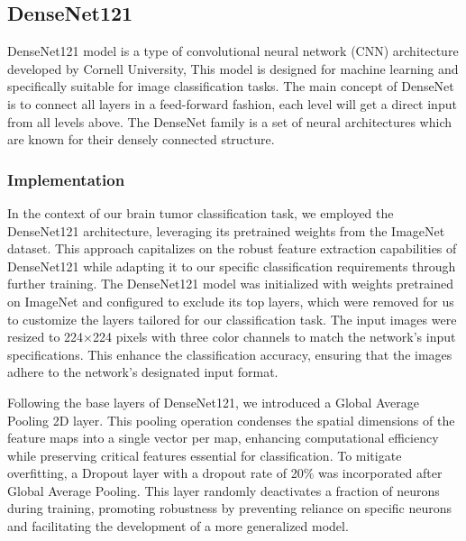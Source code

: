 \subsection{DenseNet121}\label{s:densenet121}

DenseNet121 model is a type of convolutional neural network (CNN) architecture developed by Cornell University, This model is designed for machine learning and specifically suitable for image classification tasks. The main concept of DenseNet is to connect all layers in a feed-forward fashion, each level will get a direct input from all levels above. The DenseNet family is a set of neural architectures which are known for their densely connected structure.

\subsubsection{Implementation}

In the context of our brain tumor classification task, we employed the DenseNet121 architecture, leveraging its pretrained weights from the ImageNet dataset. This approach capitalizes on the robust feature extraction capabilities of DenseNet121 while adapting it to our specific classification requirements through further training. The DenseNet121 model was initialized with weights pretrained on ImageNet and configured to exclude its top layers, which were removed for us to customize the layers tailored for our classification task. The input images were resized to 224×224 pixels with three color channels to match the network's input specifications. This enhance the classification accuracy, ensuring that the images adhere to the network's designated input format.

Following the base layers of DenseNet121, we introduced a Global Average Pooling 2D layer. This pooling operation condenses the spatial dimensions of the feature maps into a single vector per map, enhancing computational efficiency while preserving critical features essential for classification. To mitigate overfitting, a Dropout layer with a dropout rate of 20\% was incorporated after Global Average Pooling. This layer randomly deactivates a fraction of neurons during training, promoting robustness by preventing reliance on specific neurons and facilitating the development of a more generalized model.

